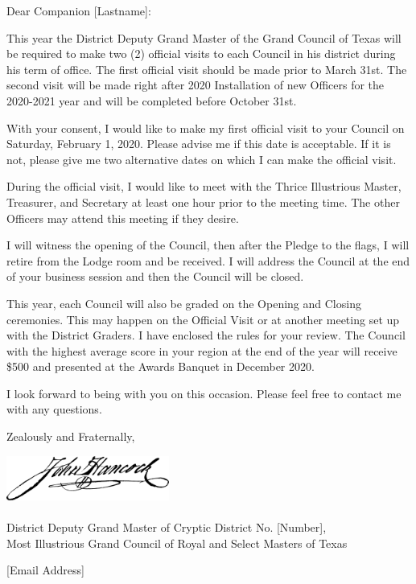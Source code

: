 \documentclass{texMemo}
\begin{document}
\maketitle
\pagestyle{empty}

Dear Companion [Lastname]:

This year the District Deputy Grand Master of the Grand Council of Texas will be required to make two (2) official visits to each Council in his district during his term of office.  The first official visit should be made prior to March 31st.  The second visit will be made right after 2020 Installation of new Officers for the 2020-2021 year and will be completed before October 31st.

With your consent, I would like to make my first official visit to your Council on Saturday, February 1, 2020. Please advise me if this date is acceptable.  If it is not, please give me two alternative dates on which I can make the official visit.

During the official visit, I would like to meet with the Thrice Illustrious Master, Treasurer, and Secretary at least one hour prior to the meeting time.  The other Officers may attend this meeting if they desire. 

I will witness the opening of the Council, then after the Pledge to the flags, I will retire from the Lodge room and be received.  I will address the Council at the end of your business session and then the Council will be closed.

This year, each Council will also be graded on the Opening and Closing ceremonies. This may happen on the Official Visit or at another meeting set up with the District Graders. I have enclosed the rules for your review. The Council with the highest average score in your region at the end of the year will receive \$500 and presented at the Awards Banquet in December 2020.

I look forward to being with you on this occasion.  Please feel free to contact me with any questions.

\bigskip
\bigskip

\begin{flushright}
	Zealously and Fraternally,\\
	\bigskip \bigskip
	
	\includegraphics[width=0.4\textwidth]{signature.png}\\
	\\
	District Deputy Grand Master of Cryptic District No. [Number],\\
	Most Illustrious Grand Council of Royal and Select Masters of Texas\\
	
	[Email Address]
\end{flushright}
\end{document}
